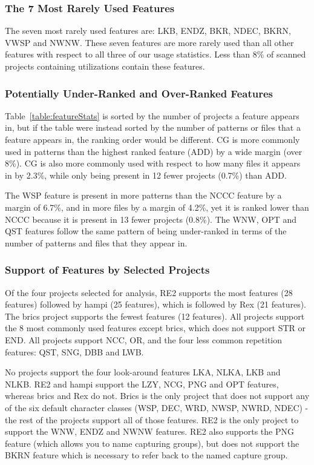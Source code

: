 \subsubsection{The 7 Most Rarely Used Features}
The seven most rarely used features are: LKB, ENDZ, BKR, NDEC, BKRN, VWSP and NWNW.  These seven features are more rarely used than all other features with respect to all three of our usage statistics.  Less than 8\% of scanned projects containing utilizations contain these features.

\subsubsection{Potentially Under-Ranked and Over-Ranked Features}
Table~\ref{table:featureStats} is sorted by the number of projects a feature appears in, but if the table were instead sorted by the number of patterns or files that a feature appears in, the ranking order would be different.  CG is more commonly used in patterns than the highest ranked feature (ADD) by a wide margin (over 8\%).  CG is also more commonly used with respect to how many files it appears in by 2.3\%, while only being present in 12 fewer projects (0.7\%) than ADD.

The WSP feature is present in more patterns than the NCCC feature by a margin of 6.7\%, and in more files by a margin of 4.2\%, yet it is ranked lower than NCCC because it is present in 13 fewer projects (0.8\%).
The WNW, OPT and QST features follow the same pattern of being under-ranked in terms of the number of patterns and files that they appear in.



\subsubsection{Support of Features by Selected Projects}
Of the four projects selected for analysis, RE2 supports the most features (28 features) followed by hampi (25 features), which is followed by Rex (21 features).  The brics project supports the fewest features (12 features).  All projects support the 8 most commonly used features except brics, which does not support STR or END.  All projects support NCC, OR, and the four less common repetition features: QST, SNG, DBB and LWB.

No projects support the four look-around features LKA, NLKA, LKB and NLKB.  RE2 and hampi support the LZY, NCG, PNG and OPT features, whereas brics and Rex do not.  Brics is the only project that does not support any of the six default character classes (WSP, DEC, WRD, NWSP, NWRD, NDEC) - the rest of the projects support all of those features.  RE2 is the only project to support the WNW, ENDZ and NWNW features.  RE2 also supports the PNG feature (which allows you to name capturing groups), but does not support the BKRN feature which is necessary to refer back to the named capture group.

